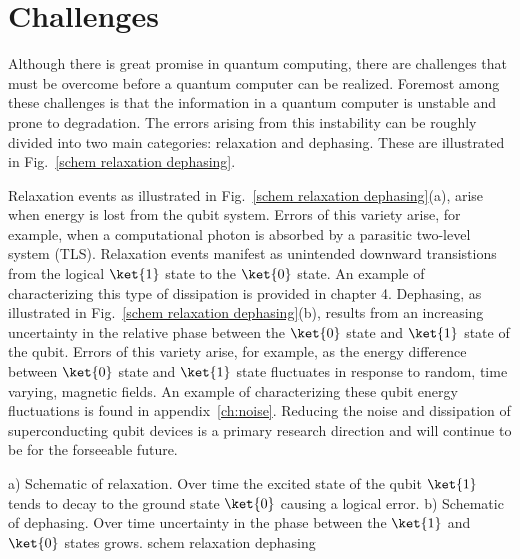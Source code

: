 \section{Challenges}
Although there is great promise in quantum computing, there are challenges that must be overcome before a quantum computer can be realized.
Foremost among these challenges is that the information in a quantum computer is unstable and prone to degradation.
The errors arising from this instability can be roughly divided into two main categories: relaxation and dephasing.
These are illustrated in Fig.~\ref{schem relaxation dephasing}.

Relaxation events as illustrated in Fig.~\ref{schem relaxation dephasing}(a), arise when energy is lost from the qubit system.
Errors of this variety arise, for example, when a computational photon is absorbed by a parasitic two-level system (TLS)\cite{Martinis2005}.
Relaxation events manifest as unintended downward transistions from the logical $\ket{1}$ state to the $\ket{0}$ state.
An example of characterizing this type of dissipation is provided in chapter 4.
Dephasing, as illustrated in Fig.~\ref{schem relaxation dephasing}(b),
results from an increasing uncertainty in the relative phase between the $\ket{0}$ state and $\ket{1}$ state of the qubit.
Errors of this variety arise, for example, as the energy difference between $\ket{0}$ state and $\ket{1}$ state fluctuates in response to random,
time varying, magnetic fields.
An example of characterizing these qubit energy fluctuations is found in appendix~\ref{ch:noise}.
Reducing the noise and dissipation of superconducting qubit devices is a primary research direction and will continue to be for the forseeable future.

{
a) Schematic of relaxation.  Over time the excited state of the qubit $\ket{1}$ tends to decay to the ground state $\ket{0}$ causing a logical error.
b) Schematic of dephasing.  Over time uncertainty in the phase between the $\ket{1}$ and $\ket{0}$ states grows.
}
{schem relaxation dephasing}


